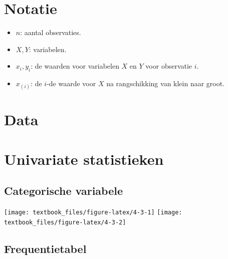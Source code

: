\documentclass[]{tufte-book}
\providecommand{\tightlist}{%
  \setlength{\itemsep}{0pt}\setlength{\parskip}{0pt}}
\begin{document}
\hypertarget{notatie}{%
\section{Notatie}\label{notatie}}

\begin{itemize}
\tightlist
\item
  \(n\): aantal observaties.
\item
  \(X, Y\): variabelen.
\item
  \(x_i, y_i\): de waarden voor variabelen \(X\) en \(Y\) voor observatie \(i\).
\item
  \(x_{(i)}\): de \(i\)-de waarde voor \(X\) na rangschikking van klein naar groot.
\end{itemize}

\hypertarget{data}{%
\section{Data}\label{data}}

\hypertarget{univariate-statistieken}{%
\section{Univariate statistieken}\label{univariate-statistieken}}

\hypertarget{categorische-variabele-1}{%
\subsection{Categorische variabele}\label{categorische-variabele-1}}

\texttt{[image: textbook\_files/figure-latex/4-3-1]}
\texttt{[image: textbook\_files/figure-latex/4-3-2]}

\hypertarget{frequentietabel}{%
\subsection*{Frequentietabel}\label{frequentietabel}}
\end{document}
